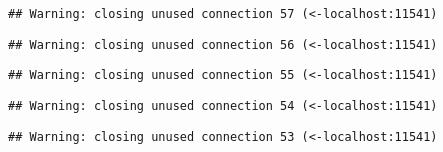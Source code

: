 \documentclass[]{article}
\begin{document}
\begin{verbatim}
## Warning: closing unused connection 57 (<-localhost:11541)
\end{verbatim}

\begin{verbatim}
## Warning: closing unused connection 56 (<-localhost:11541)
\end{verbatim}

\begin{verbatim}
## Warning: closing unused connection 55 (<-localhost:11541)
\end{verbatim}

\begin{verbatim}
## Warning: closing unused connection 54 (<-localhost:11541)
\end{verbatim}

\begin{verbatim}
## Warning: closing unused connection 53 (<-localhost:11541)
\end{verbatim}
\end{document}
